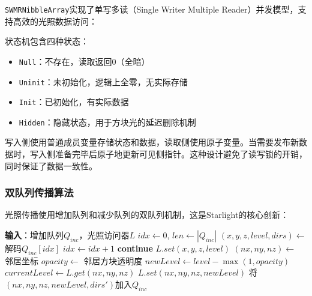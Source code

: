 \texttt{SWMRNibbleArray}实现了单写多读（Single Writer Multiple Reader）并发模型，支持高效的光照数据访问：

状态机包含四种状态：
\begin{itemize}
    \item \texttt{Null}：不存在，读取返回0（全暗）
    \item \texttt{Uninit}：未初始化，逻辑上全零，无实际存储
    \item \texttt{Init}：已初始化，有实际数据
    \item \texttt{Hidden}：隐藏状态，用于方块光的延迟删除机制
\end{itemize}

写入侧使用普通成员变量存储状态和数据，读取侧使用原子变量。当需要发布新数据时，写入侧准备完毕后原子地更新可见侧指针。这种设计避免了读写锁的开销，同时保证了数据一致性。

\subsubsection{双队列传播算法}

光照传播使用增加队列和减少队列的双队列机制，这是Starlight的核心创新：

\begin{algorithm}
\caption{光照增加传播算法}
\begin{algorithmic}[1]
\STATE \textbf{输入}：增加队列$Q_{inc}$，光照访问器$L$
\STATE $idx \gets 0$, $len \gets |Q_{inc}|$
    \STATE $(x, y, z, level, dirs) \gets$ 解码$Q_{inc}[idx]$
    \STATE $idx \gets idx + 1$
            \STATE \textbf{continue} 
        \ENDIF
        \STATE $L.set(x, y, z, level)$
    \ENDIF
        \STATE $(nx, ny, nz) \gets$ 邻居坐标
        \STATE $opacity \gets$ 邻居方块透明度
        \STATE $newLevel \gets level - \max(1, opacity)$
        \STATE $currentLevel \gets L.get(nx, ny, nz)$
            \STATE $L.set(nx, ny, nz, newLevel)$
                \STATE 将$(nx, ny, nz, newLevel, dirs')$加入$Q_{inc}$
            \ENDIF
        \ENDIF
    \ENDFOR
\ENDWHILE
\end{algorithmic}
\end{algorithm}

